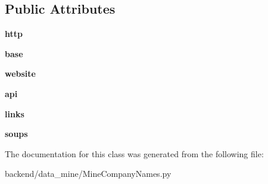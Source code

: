 \subsection*{Public Attributes}
\begin{DoxyCompactItemize}
\item 
\mbox{\label{classdata__mine_1_1_mine_company_names_1_1_mine_company_names_ab9f679172eb7fa5a318b7d369b6b0c31}} 
{\bfseries http}
\item 
\mbox{\label{classdata__mine_1_1_mine_company_names_1_1_mine_company_names_a8d68b3612e15050e8e95ae38532013e7}} 
{\bfseries base}
\item 
\mbox{\label{classdata__mine_1_1_mine_company_names_1_1_mine_company_names_a496516ceb33d6d4c1bfc9df6c4f6e1f7}} 
{\bfseries website}
\item 
\mbox{\label{classdata__mine_1_1_mine_company_names_1_1_mine_company_names_a55fdcedd272960dcd39e1edb87a06686}} 
{\bfseries api}
\item 
\mbox{\label{classdata__mine_1_1_mine_company_names_1_1_mine_company_names_a68055c64a3c1472b02c29818389fe18f}} 
{\bfseries links}
\item 
\mbox{\label{classdata__mine_1_1_mine_company_names_1_1_mine_company_names_a59c673078f28bb0ef69265b0f2414288}} 
{\bfseries soups}
\end{DoxyCompactItemize}


The documentation for this class was generated from the following file\+:\begin{DoxyCompactItemize}
\item 
backend/data\+\_\+mine/Mine\+Company\+Names.\+py\end{DoxyCompactItemize}

